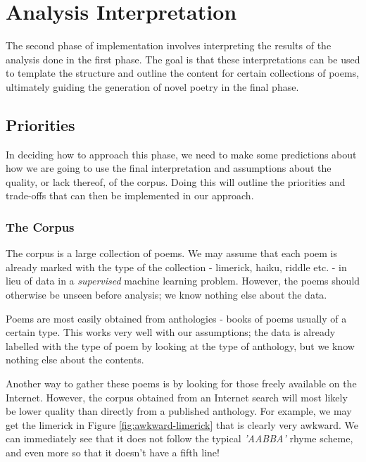 \chapter{Analysis Interpretation}
\ifpdf
    \graphicspath{{Implementation/ImplementationFigs/PNG/}{Implementation/ImplementationFigs/PDF/}{Implementation/ImplementationFigs/}}
\else
    \graphicspath{{Implementation/ImplementationFigs/EPS/}{Implementation/ImplementationFigs/}}
\fi

The second phase of implementation involves interpreting the results of the analysis done in the first phase. The goal is that these interpretations can be used to template the structure and outline the content for certain collections of poems, ultimately guiding the generation of novel poetry in the final phase.

\section{Priorities}
In deciding how to approach this phase, we need to make some predictions about how we are going to use the final interpretation and assumptions about the quality, or lack thereof, of the corpus. Doing this will outline the priorities and trade-offs that can then be implemented in our approach.


\subsection{The Corpus}

The corpus is a large collection of poems. We may assume that each poem is already marked with the type of the collection - limerick, haiku, riddle etc. - in lieu of data in a \textit{supervised} machine learning problem. However, the poems should otherwise be unseen before analysis; we know nothing else about the data. 

Poems are most easily obtained from anthologies - books of poems usually of a certain type. This works very well with our assumptions; the data is already labelled with the type of poem by looking at the type of anthology, but we know nothing else about the contents.

Another way to gather these poems is by looking for those freely available on the Internet. However, the corpus obtained from an Internet search will most likely be lower quality than directly from a published anthology. For example, we may get the limerick in Figure \ref{fig:awkward-limerick} that is clearly very awkward. We can immediately see that it does not follow the typical \textit{'AABBA'} rhyme scheme, and even more so that it doesn't have a fifth line!


